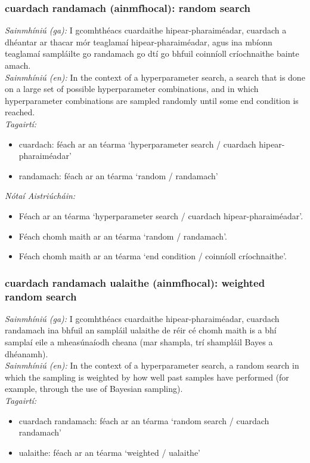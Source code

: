 \subsubsection*{cuardach randamach (ainmfhocal): random search}
 \noindent \textit{Sainmhíniú (ga):} I gcomhthéacs cuardaithe hipear-pharaiméadar, cuardach a dhéantar ar thacar mór teaglamaí hipear-pharaiméadar, agus ina mbíonn teaglamaí sampláilte go randamach go dtí go bhfuil coinníoll críochnaithe bainte amach.
\\
 \noindent \textit{Sainmhíniú (en):} In the context of a hyperparameter search, a search that is done on a large set of possible hyperparameter combinations, and in which hyperparameter combinations are sampled randomly until some end condition is reached.
\\
 \noindent \textit{Tagairtí:}
\begin{itemize}
	\item cuardach: féach ar an téarma `hyperparameter search / cuardach hipear-pharaiméadar'
	\item randamach: féach ar an téarma `random / randamach'
\end{itemize}

 \noindent \textit{Nótaí Aistriúcháin:}
\begin{itemize}
	\item Féach ar an téarma `hyperparameter search / cuardach hipear-pharaiméadar'.
	\item Féach chomh maith ar an téarma `random / randamach'.
	\item Féach chomh maith ar an téarma `end condition / coinníoll críochnaithe'.
\end{itemize}


\subsubsection*{cuardach randamach ualaithe (ainmfhocal): weighted random search}
 \noindent \textit{Sainmhíniú (ga):} I gcomhthéacs cuardaithe hipear-pharaiméadar, cuardach randamach ina bhfuil an sampláil ualaithe de réir cé chomh maith is a bhí samplaí eile a mheasúnaíodh cheana (mar shampla, trí shampláil Bayes a dhéanamh).
\\
 \noindent \textit{Sainmhíniú (en):} In the context of a hyperparameter search, a random search in which the sampling is weighted by how well past samples have performed (for example, through the use of Bayesian sampling).
\\
 \noindent \textit{Tagairtí:}
\begin{itemize}
	\item cuardach randamach: féach ar an téarma `random search / cuardach randamach'
	\item ualaithe: féach ar an téarma `weighted / ualaithe'
\end{itemize}

